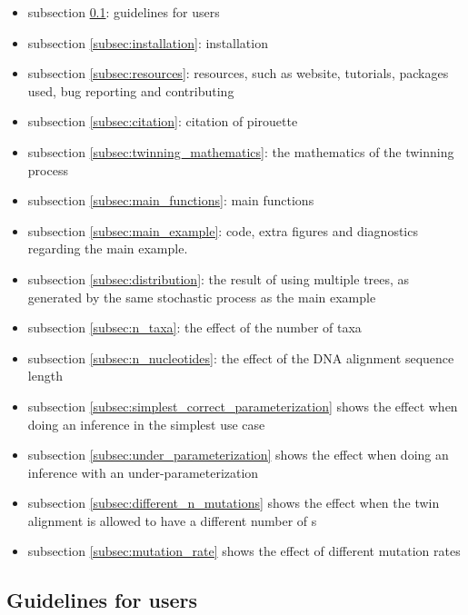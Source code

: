 \begin{itemize}
  \item{
    subsection \ref{subsec:guidelines}: guidelines for users
  }
  \item{
    subsection \ref{subsec:installation}: installation
  }
  \item{
    subsection \ref{subsec:resources}: resources, such as 
    website, tutorials, packages used, bug reporting and contributing
  }
  \item{
    subsection \ref{subsec:citation}: citation of pirouette
  }
  \item{
    subsection \ref{subsec:twinning_mathematics}: the mathematics of the
    twinning process
  }
  \item{
    subsection \ref{subsec:main_functions}: main functions
  }
  \item{
    subsection \ref{subsec:main_example}: code, extra figures and
    diagnostics regarding the main example.
  }
  \item{
    subsection \ref{subsec:distribution}: the result of using 
    multiple trees, as generated by the
    same stochastic process as the main example
  }
  \item{
    subsection \ref{subsec:n_taxa}: the effect of the number
    of taxa
  }
  \item{
    subsection \ref{subsec:n_nucleotides}: the effect of the DNA
    alignment sequence length
  }
  \item{
    subsection \ref{subsec:simplest_correct_parameterization} shows the
    effect when doing an inference in the simplest use case
  }
  \item{
    subsection \ref{subsec:under_parameterization} shows the
    effect when doing an inference with an under-parameterization
  }
  \item{
    subsection \ref{subsec:different_n_mutations} shows the
    effect when the twin alignment is allowed to have a different
    number of s
  }
  \item{
    subsection \ref{subsec:mutation_rate} shows the
    effect of different mutation rates
  }
\end{itemize}

\subsection{Guidelines for users}
\label{subsec:guidelines}

